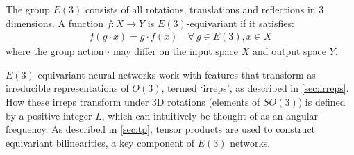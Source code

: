 \documentclass{article}
\theoremstyle{definition}
\theoremstyle{remark}
\begin{document}





The group $E(3)$ consists of all rotations, translations and reflections in 3 dimensions. A function $f: X \to Y$ is $E(3)$-equivariant if it satisfies:
\begin{align}
    \label{eqn:equiv}
    f(g \cdot x) = g \cdot f(x) \quad \forall \ g \in E(3), x \in X
\end{align}
where the group action $\cdot$ may differ on the input space $X$ and output space $Y$. 

$E(3)$-equivariant neural networks work with features that transform as irreducible representations of $O(3)$, termed `irreps', as described in \autoref{sec:irreps}. How these  irreps transform under 3D rotations 
(elements of $SO(3)$) is defined by a positive integer $L$, which can intuitively be thought of as an angular frequency. As described in \autoref{sec:tp}, tensor products are used to construct equivariant bilinearities, a key component of $E(3)$ networks.
\end{document}
